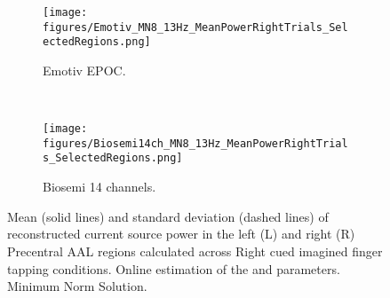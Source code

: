 \documentclass[10pt]{article}
\begin{document}
\begin{center}
\iffalse{
We here explore the SBS2 framework ability to adaptive estimating the model parameters  and , which determines the overall regularization of the source solution, . Figure~\ref{figure_3Dbrain_hyperparameters} demonstrate online estimation of the model parameters  and , the signal-to-noise ratio (SNR), and the regularization .
\begin{figure}[!t]
\centering
\texttt{[image: figures/Emotiv\_MN8\_13Hz\_OnlineTrack\_Regularization\_Zoom.png]}
\caption{Adaptive estimation of regularization term - \comment{CS}{Note we actually update the hyperparameters more often here than on on the phone/tablet - should we leave the figure or take it out?}}
\label{figure_3Dbrain_hyperparameters}
\end{figure}
}\fi







\begin{figure}
        \centering
        \begin{subfigure}[b]{0.8\columnwidth}
                \centering
        		\texttt{[image: figures/Emotiv\_MN8\_13Hz\_MeanPowerRightTrials\_SelectedRegions.png]}
				\caption{Emotiv EPOC.}
				\label{figure_Emotiv_PowerInPrecentralAALregions}
        \end{subfigure}

        ~ \begin{subfigure}[b]{0.8\columnwidth}
                \centering
               \texttt{[image: figures/Biosemi14ch\_MN8\_13Hz\_MeanPowerRightTrials\_SelectedRegions.png]}
\caption{Biosemi 14 channels. }
\label{figure_Biosemi14ch_PowerInPrecentralAALregions}
        \end{subfigure}
     \caption{Mean (solid lines) and standard deviation (dashed lines) of reconstructed current source power in the left (L) and right (R) Precentral AAL regions calculated across Right cued imagined finger tapping conditions. Online estimation of the  and  parameters. Minimum Norm Solution.}
\end{figure}

\iffalse{
\begin{figure}[!t]
\centering
\texttt{[image: figures/Emotiv\_3Dsourcerecon\_Trial190Left\_6timepoints.png]}
\caption{Emotiv EPOC. Reconstructed alpha (8-13 Hz) source power obtained using the MN method at different time points after a left imagined finger tapping cue (0 ms).}
\label{figure_Emotiv_3Dsourcerecon_Trial190Left_6timepoints}
\end{figure}
}\fi



\end{center}
\end{document}
